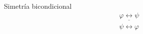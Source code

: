 \begin{ruleinf} \label{relinf_equivsym} Simetría bicondicional
	\begin{equation}
	\begin{gathered}
		\underline {\varphi \leftrightarrow \psi } \\
		\psi \leftrightarrow \varphi
	\end{gathered}
	\end{equation}
\end{ruleinf}
